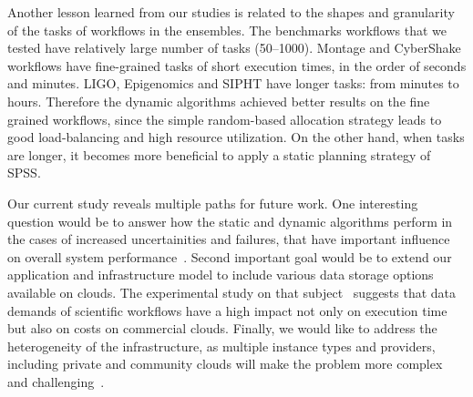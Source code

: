 \documentclass{sig-alternate}
\begin{document}
Another lesson learned from our studies is related to the shapes and granularity
of the tasks of workflows in the ensembles. The benchmarks workflows that we
tested have relatively large number of tasks (50--1000). Montage and CyberShake
workflows have fine-grained tasks of short execution times, in the order of
seconds and minutes. LIGO, Epigenomics and SIPHT have longer tasks: from minutes to hours.
Therefore the dynamic algorithms achieved better results on the fine grained
workflows, since the simple random-based allocation strategy leads to good
load-balancing and high resource utilization. On the other hand, when tasks are
longer, it becomes more beneficial to apply a static planning strategy of SPSS.

Our current study reveals multiple paths for future work. One interesting
question would be to answer how the static and dynamic algorithms perform in the
cases of increased uncertainities and failures, that have important influence
on overall system performance~\cite{Sakellariou2010,Dongarra2007}. Second
important goal would be to extend our application and infrastructure model to
include various data storage options available on clouds. The experimental study
on that subject~\cite{Juve2010} suggests that data demands of scientific
workflows have a high impact not only on execution time but also on costs on
commercial clouds. Finally, we would like to address the heterogeneity of the
infrastructure, as multiple instance types and providers, including private
and community clouds will make the problem more complex and
challenging~\cite{Marshall2010,vockler11,Juve2010}.







\end{document}
